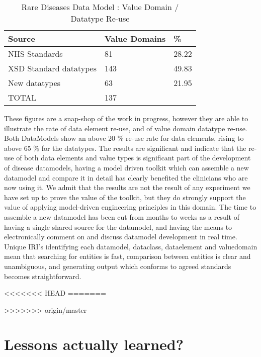\begin{table}[h]
	\caption{Rare Diseases Data Model : Value Domain / Datatype Re-use}
	\begin{tabular}{ p{2.8cm} p{1.8cm}  p{1.8cm}      }  %
		\hline
		Source & Value Domains& \%  \\ 
		\hline
		NHS Standards & 81 & 28.22\\
		XSD Standard datatypes & 143 & 49.83 \\
		New datatypes & 63 & 21.95 \\
		\hline
		TOTAL & 137
	\end{tabular}
\end{table}

These figures are a snap-shop of the work in progress, however they are able to illustrate the rate of data element re-use, and of value domain datatype re-use. Both DataModels show an above 20 \% re-use rate for data elements, rising to above 65 \% for the datatypes. The results are significant and indicate that the re-use of both data elements and value types is significant part of the development of disease datamodels, having a model driven toolkit which can assemble a new datamodel and compare it in detail has clearly benefited the clinicians who are now using it.  We admit that the results are not the result of any experiment we have set up to prove the value of the toolkit, but they do strongly support the value of applying model-driven engineering principles in this domain. The time to assemble a new datamodel has been cut from months to weeks as a result of having a single shared source for the datamodel, and having the means to electronically comment on and discuss datamodel development in real time. Unique IRI's identifying each datamodel, dataclass, dataelement and valuedomain mean that searching for entities is fast, comparison between entities is clear and unambiguous, and generating output which conforms to agreed standards becomes straightforward.



<<<<<<< HEAD
=======



>>>>>>> origin/master
\section{Lessons actually learned?}

